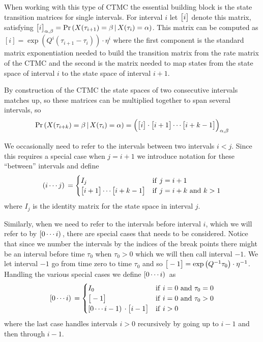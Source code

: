 When working with this type of CTMC the essential building block is the state transition matrices for single intervals. For interval $i$ let $\mathbf{\big[}i\mathbf{\big]}$ denote this matrix, satisfying $\mathbf{\big[}i\mathbf{\big]}_{\alpha,\beta} = \Pr\left(X(\tau_{i+1})=\beta\,|\,X(\tau_i)=\alpha\right)$. This matrix can be computed as $[i] = \exp\left(Q^{i}\left(\tau_{i+1}-\tau_i\right)\right) \cdot \eta^i$ where the first component is the standard matrix exponentiation needed to build the transition matrix from the rate matrix of the CTMC and the second is the matrix needed to map states from the state space of interval $i$ to the state space of interval $i+1$.

By construction of the CTMC the state spaces of two consecutive intervals matches up, so these matrices can be multiplied together to span several intervals, so 
\[
    \Pr\left( X(\tau_{i+k})=\beta \,|\, X(\tau_i)=\alpha \right) =
    \Big(\mathbf{\big[}i\mathbf{\big]}\cdot\mathbf{\big[}i+1\mathbf{\big]}\cdots\mathbf{\big[}i+k-1\mathbf{\big]}\Big)_{\alpha,\beta}
\]

We occasionally need to refer to the intervals between two intervals $i<j$. Since this requires a special case when $j=i+1$ we introduce notation for these ``between'' intervals and define
\begin{equation}
\label{def:between}
    \between{i}{j} =
    \begin{cases}
        I_j & \mathrm{if}\ j=i+1 \\
        \interval{i+1}\cdots\interval{i+k-1} & \mathrm{if}\ j=i+k\ \mathrm{and}\ k>1
    \end{cases}
\end{equation}
where $I_j$ is the identity matrix for the state space in interval $j$.

Similarly, when we need to refer to the intervals before interval $i$, which we will refer to by $\mathbf{[}0\cdots i\mathbf{)}\,$, there are special cases that needs to be considered. Notice that since we number the intervals by the indices of the break points there might be an interval before time $\tau_0$ when $\tau_0>0$ which we will then call interval $-1$. We let interval $-1$ go from time zero to time $\tau_0$ and so $\mathbf{\big[}-1\mathbf{\big]}=\exp\left( Q^{-1}\tau_0 \right)\cdot \eta^{-1}$. Handling the various special cases we define $\mathbf{[}0\cdots i\mathbf{)}\,$ as
\begin{equation}
\label{def:upto}
    \upto{i} =
    \begin{cases}
        I_0             & \mathrm{if}\ i = 0\ \mathrm{and}\ \tau_0=0 \\
        \interval{-1}   & \mathrm{if}\ i = 0\ \mathrm{and}\ \tau_0>0 \\
        \upto{i-1}\cdot\interval{i-1} & \mathrm{if}\ i>0
    \end{cases}
\end{equation}
where the last case handles intervals $i>0$ recursively by going up to $i-1$ and then through $i-1$.


